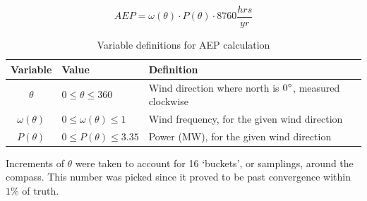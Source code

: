\documentclass[12pt]{article}
\begin{document}
    \begin{equation}
        AEP = \omega (\theta) \cdot P (\theta) \cdot 8760 \frac{hrs}{yr}
        \label{Eq:AEP}
    \end{equation}
\vspace{-0.5cm}
    \begin{table}[H]
        \centering
        \begin{tabular}{|c|l|l|}
            \hline
            Variable & Value & Definition \\ \hline
            $\theta$ & $0 \leq \theta \leq 360$ & Wind direction where north is $0 \degree$, measured clockwise \\ \hline
            $\omega(\theta)$ & $0 \leq \omega(\theta) \leq 1$ & Wind frequency, for the given wind direction \\ \hline
            $P(\theta)$ & $0 \leq P(\theta) \leq 3.35 $ & Power (MW), for the given wind direction \\ \hline
        \end{tabular}
        \caption{Variable definitions for AEP calculation}
        \label{tab:AEP}
    \end{table}
    
    Increments of $\theta$ were taken to account for 16 `buckets', or samplings, around the compass. This number was picked since it proved to be past convergence within $1\%$ of truth.

\newpage
\section*{}


\end{document}
